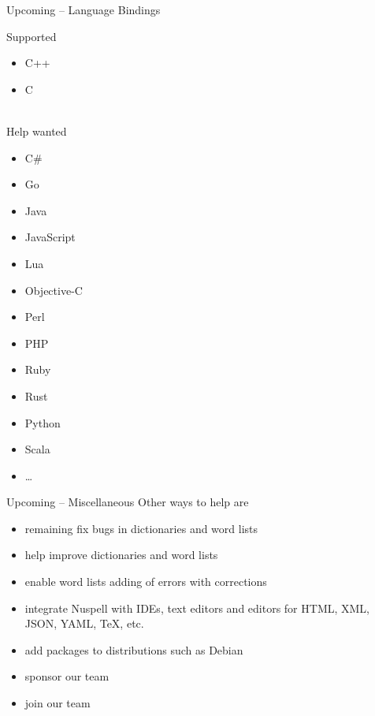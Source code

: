 \documentclass{beamer}
\begin{document}
\begin{frame}{Upcoming – Language Bindings}
\begin{multicols}{2}
Supported
\begin{itemize}
\item C++
\item C
\end{itemize}
\mbox{}\\
\alert{Help wanted}
\begin{itemize}
\item C\#
\item Go
\item Java
\item JavaScript
\item Lua
\item Objective-C
\item Perl
\item PHP
\item Ruby
\item Rust
\item Python
\item Scala
\item …
\end{itemize}
\end{multicols}
\end{frame}

\begin{frame}{Upcoming – Miscellaneous}
Other ways to help are
\begin{itemize}
\item remaining fix bugs in dictionaries and word lists
\item help improve dictionaries and word lists
\item enable word lists adding of errors with corrections
\item integrate Nuspell with IDEs, text editors and editors for HTML, XML, JSON, YAML, \TeX{}, etc.
\item add packages to distributions such as Debian
\item sponsor our team
\item join our team
\end{itemize}
\end{frame}
\end{document}
